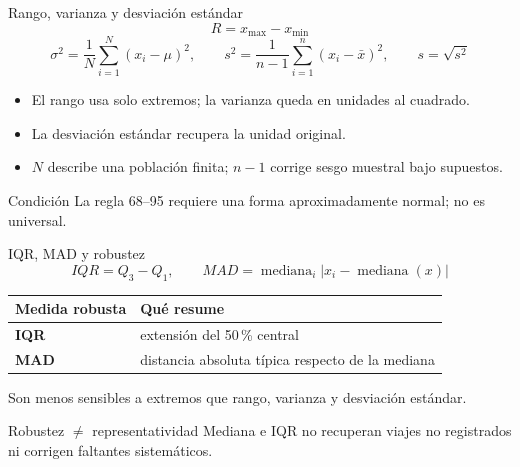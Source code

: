 \documentclass[aspectratio=169,11pt]{beamer}
\begin{document}
\begin{frame}{Rango, varianza y desviación estándar}
  \small
  \[
    R=x_{\max}-x_{\min}
  \]
  \[
    \sigma^2=\frac{1}{N}\sum_{i=1}^{N}(x_i-\mu)^2,\qquad
    s^2=\frac{1}{n-1}\sum_{i=1}^{n}(x_i-\bar{x})^2,\qquad s=\sqrt{s^2}
  \]
  \begin{itemize}
    \item El rango usa solo extremos; la varianza queda en unidades al cuadrado.
    \item La desviación estándar recupera la unidad original.
    \item $N$ describe una población finita; $n-1$ corrige sesgo muestral bajo supuestos.
  \end{itemize}
  \begin{alertblock}{Condición}
    La regla 68--95 requiere una forma aproximadamente normal; no es universal.
  \end{alertblock}
\end{frame}

\begin{frame}{IQR, MAD y robustez}
  \small
  \[
    IQR=Q_3-Q_1,\qquad
    MAD=\operatorname{mediana}_i\left|x_i-\operatorname{mediana}(x)\right|
  \]
  \begin{tabularx}{\textwidth}{>{\bfseries}p{} X}
    \toprule
    Medida robusta & Qué resume \\
    \midrule
    IQR & extensión del 50\,\% central \\
    MAD & distancia absoluta típica respecto de la mediana \\
    \bottomrule
  \end{tabularx}
  \vfill
  Son menos sensibles a extremos que rango, varianza y desviación estándar.
  \begin{alertblock}{Robustez $\neq$ representatividad}
    Mediana e IQR no recuperan viajes no registrados ni corrigen faltantes sistemáticos.
  \end{alertblock}
\end{frame}
\end{document}

